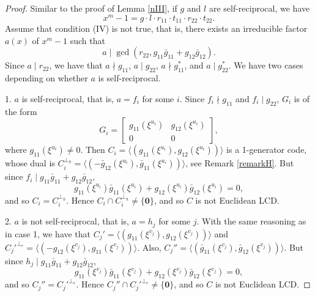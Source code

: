 \documentclass[a4paper,12pt]{article}
\begin{document}
\begin{proof}
Similar to the proof of Lemma \ref{nIII}, if $g$ and $l$ are self-reciprocal, we have
\[
x^m-1  = g \cdot l \cdot r_{11} \cdot t_{11} \cdot r_{22} \cdot t_{22}.
\] 
Assume that condition (IV) is not true, that is, there exists an irreducible factor  $a(x)$ of $x^m-1$ such that 
$$a \mid \gcd(r_{22}, g_{11}\bar{g}_{11}+g_{12} \bar{g}_{12}).$$
Since $a \mid r_{22}$, we have that  $a \nmid g_{11}$,  $a \mid g_{22}$,  $a \nmid g_{11}^*$,  and $a \mid g_{22}^*$.   We have two cases depending on whether $a$ is self-reciprocal. 

1. $a$ is self-reciprocal, that is, $a=f_i$ for some $i$. Since $f_i  \nmid g_{11}$ and $f_i \mid g_{22}$, $G_i$ is of the form
\[
G_i=  \begin{bmatrix}
g_{11}(\xi^{u_i}) & g_{12}(\xi^{u_i}) \\
0 & 0
\end{bmatrix},
\] 
where $g_{11}(\xi^{u_i}) \ne 0$. Then   $C_i =\langle (g_{11}(\xi^{u_i}), g_{12}(\xi^{u_i}))\rangle$ is a 1-generator code, whose dual is $C_i^{\perp_h} =\langle (-\bar{g}_{12}(\xi^{u_i}),\bar{g}_{11}(\xi^{u_i}))\rangle$, see Remark \ref{remarkH}.  But since $f_i \mid  g_{11}\bar{g}_{11}+g_{12} \bar{g}_{12}$, 
\[
 g_{11}(\xi^{u_i})\bar{g}_{11}(\xi^{u_i})+g_{12}(\xi^{u_i}) \bar{g}_{12}(\xi^{u_i}) =0, 
\]
and so $C_i = C_i^{\perp_h}$. Hence $C_i \cap  C_i^{\perp_h} \ne \{\mathbf{0}\}$, and so $C$ is not Euclidean LCD. 

2. $a$ is not self-reciprocal, that is, $a=h_j$ for some $j$. With the same reasoning as in case 1, we have that $C_j' =\langle (g_{11}(\xi^{v_j}), g_{12}(\xi^{v_j}))\rangle$ and $C_j'^{\perp_e} =\langle (-g_{12}(\xi^{v_j}), g_{11}(\xi^{v_j}))\rangle$. Also, $C_j'' =\langle (\bar{g}_{11}(\xi^{v_j}), \bar{g}_{12}(\xi^{v_j}))\rangle$. 
But since $h_j \mid g_{11}\bar{g}_{11}+g_{12} \bar{g}_{12}$, 
\[
 g_{11}(\xi^{v_j})\bar{g}_{11}(\xi^{v_j})+g_{12}(\xi^{v_j}) \bar{g}_{12}(\xi^{v_j}) =0, 
\]
and so $C_j'' = C_j'^{\perp_e}$. Hence $C_j'' \cap  C_j'^{\perp_e} \ne \{\mathbf{0}\}$, and so $C$ is not Euclidean LCD. \qedhere



\end{proof}
\end{document}

